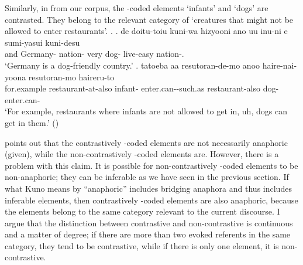 Similarly, in \Next from our corpus,
the -coded elements  `infants' and  `dogs' are contrasted.
They belong to the relevant category of `creatures that might not be allowed to enter restaurants'.
%
\ex.
 \ag. de doitu-toiu kuni-wa hizyooni ano uu inu-ni e sumi-yasui kuni-desu \\
 	and Germany- nation- very   dog-  live-easy nation-. \\
	`Germany is a dog-friendly country.'
 \bg. tatoeba aa resutoran-de-mo anoo  haire-nai-yoona resutoran-mo  haireru-to \\
 	for.example  restaurant-at-also  infant- enter.can--such.as restaurant-also dog- enter.can- \\
 	`For example, restaurants where infants are not allowed to get in, uh, dogs can get in them.'
	\hfill{()}


 points out that
the contrastively -coded elements are not necessarily anaphoric (given),
while the non-contrastively -coded elements are.
However, there is a problem with this claim.
It is possible for non-contrastively -coded elements to be non-anaphoric;
they can be inferable as we have seen in the previous section.
If what Kuno means by ``anaphoric'' includes bridging anaphora \cite{clark75} and thus includes inferable elements,
then contrastively -coded elements are also anaphoric,
because the elements belong to the same category relevant to the current discourse.
I argue that the distinction between contrastive and non-contrastive is continuous and a matter of degree;
if there are more than two evoked referents in the same category,
they tend to be contrastive,
while if there is only one element,
it is non-contrastive.
%
%




